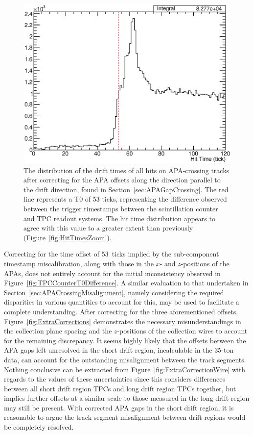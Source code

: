 \begin{figure}
  \centering
  \includegraphics[width=12cm]{HitTimesFixed.eps}
  \caption[The distribution of the drift times of all hits on APA-crossing tracks after correcting for the APA offsets along the direction parallel to the drift direction.]{The distribution of the drift times of all hits on APA-crossing tracks after correcting for the APA offsets along the direction parallel to the drift direction, found in Section~\ref{sec:APAGapCrossing}.  The red line represents a T0 of 53 ticks, representing the difference observed between the trigger timestamps between the scintillation counter and TPC readout systems.  The hit time distribution appears to agree with this value to a greater extent than previously (Figure~\ref{fig:HitTimesZoom}).}
  \label{fig:HitTimesFixed}
\end{figure}

Correcting for the time offset of 53~ticks implied by the sub-component timestamp miscalibration, along with those in the $x$- and $z$-positions of the APAs, does not entirely account for the initial inconsistency observed in Figure~\ref{fig:TPCCounterT0Difference}.  A similar evaluation to that undertaken in Section~\ref{sec:APACrossingMisalignment}, namely considering the required disparities in various quantities to account for this, may be used to facilitate a complete understanding.  After correcting for the three aforementioned offsets, Figure~\ref{fig:ExtraCorrections} demonstrates the necessary misunderstandings in the collection plane spacing and the $z$-positions of the collection wires to account for the remaining discrepancy.  It seems highly likely that the offsets between the APA gaps left unresolved in the short drift region, incalculable in the 35-ton data, can account for the outstanding misalignment between the track segments.  Nothing conclusive can be extracted from Figure~\ref{fig:ExtraCorrectionWire} with regards to the values of these uncertainties since this considers differences between all short drift region TPCs and long drift region TPCs together, but implies further offsets at a similar scale to those measured in the long drift region may still be present.  With corrected APA gaps in the short drift region, it is reasonable to argue the track segment misalignment between drift regions would be completely resolved.

